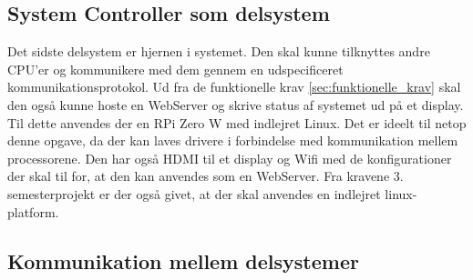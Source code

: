 \documentclass[Rapport/Rapport_main.tex]{subfiles}
\begin{document}
\subsection{System Controller som delsystem}
Det sidste delsystem er hjernen i systemet. Den skal kunne tilknyttes andre CPU'er og kommunikere med dem gennem en udspecificeret kommunikationsprotokol. Ud fra de funktionelle krav \ref{sec:funktionelle_krav} skal den også kunne hoste en WebServer og skrive status af systemet ud på et display.\\
Til dette anvendes der en RPi Zero W med indlejret Linux. Det er ideelt til netop denne opgave, da der kan laves drivere i forbindelse med kommunikation mellem processorene. Den har også HDMI til et display og  Wifi med de konfigurationer der skal til for, at den kan anvendes som en WebServer. Fra kravene 3. semesterprojekt\cite{} er der også givet, at der skal anvendes en indlejret linux-platform. 

\subsection{Kommunikation mellem delsystemer}
\end{document}
